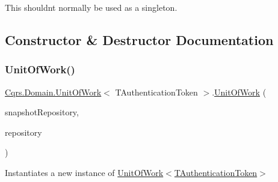 This shouldn\textquotesingle{}t normally be used as a singleton. 

\subsection{Constructor \& Destructor Documentation}
\mbox{\label{classCqrs_1_1Domain_1_1UnitOfWork_a9ec92dbd580f3885f7cf5a9ad360e1ac_a9ec92dbd580f3885f7cf5a9ad360e1ac}} 
\subsubsection{\texorpdfstring{Unit\+Of\+Work()}{UnitOfWork()}\hspace{0.1cm}{\footnotesize\ttfamily [1/2]}}
{\footnotesize\ttfamily \hyperlink{classCqrs_1_1Domain_1_1UnitOfWork}{Cqrs.\+Domain.\+Unit\+Of\+Work}$<$ T\+Authentication\+Token $>$.\hyperlink{classCqrs_1_1Domain_1_1UnitOfWork}{Unit\+Of\+Work} (\begin{DoxyParamCaption}\item[{\hyperlink{interfaceCqrs_1_1Domain_1_1ISnapshotAggregateRepository}{I\+Snapshot\+Aggregate\+Repository}$<$ T\+Authentication\+Token $>$}]{snapshot\+Repository,  }\item[{\hyperlink{interfaceCqrs_1_1Domain_1_1IAggregateRepository}{I\+Aggregate\+Repository}$<$ T\+Authentication\+Token $>$}]{repository }\end{DoxyParamCaption})}



Instantiates a new instance of \hyperlink{classCqrs_1_1Domain_1_1UnitOfWork_a9ec92dbd580f3885f7cf5a9ad360e1ac_a9ec92dbd580f3885f7cf5a9ad360e1ac}{Unit\+Of\+Work$<$\+T\+Authentication\+Token$>$} 

\mbox{\label{classCqrs_1_1Domain_1_1UnitOfWork_a717facda044d5025e9d7abdec4f54acd_a717facda044d5025e9d7abdec4f54acd}} 
